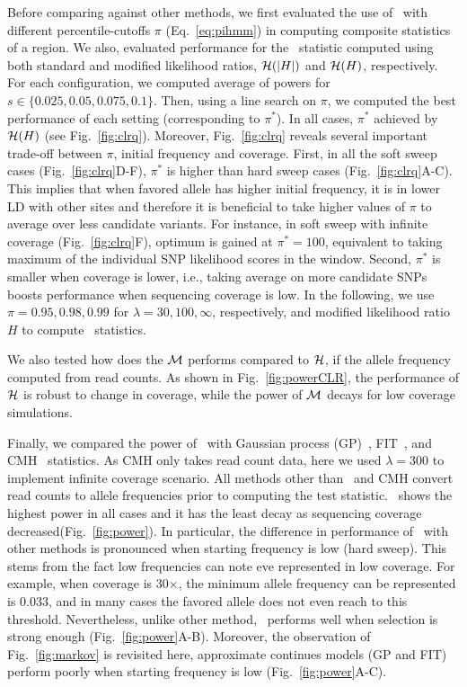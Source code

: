 Before comparing against other methods, we first evaluated the use of \comale\ 
with different percentile-cutoffs $\pi$ (Eq.~\ref{eq:pihmm})
in computing composite statistics of a region. 
We also, evaluated 
performance for the \comale\ statistic computed using both standard and 
modified likelihood ratios, ${\cal H}(|H|)$ and ${\cal H}(H)$, respectively.
For each configuration, we computed average of powers for 
$s\in\{0.025,0.05,0.075,0.1\}$. 
Then, using a line search on $\pi$, we computed the best performance of each 
setting (corresponding to $\pi^*$). In all cases, $\pi^*$ achieved by ${\cal H}(H)$ 
(see Fig.~\ref{fig:clrq}).
Moreover, Fig.~\ref{fig:clrq} reveals several important trade-off between 
$\pi$, initial frequency and coverage.
First, in all the soft sweep cases (Fig.~\ref{fig:clrq}D-F), $\pi^*$ is higher 
than hard sweep cases (Fig.~\ref{fig:clrq}A-C). This implies that when 
favored allele has higher initial frequency, it 
is in lower LD with other sites and therefore it is beneficial to take higher 
values of $\pi$ to average over less candidate variants. For instance, in soft 
sweep with infinite coverage 
(Fig.~\ref{fig:clrq}F), optimum is gained at $\pi^*=100$, equivalent to taking 
maximum of the individual SNP likelihood scores in the window.
Second, $\pi^*$ is smaller when coverage is lower, i.e., taking average on more 
candidate SNPs boosts performance when sequencing coverage is low.
In the following, we use $\pi=0.95,0.98, 0.99$ for $\lambda=30,100,\infty$, 
respectively, and modified likelihood ratio $H$ to 
compute \comale\ statistics.

We also tested how does the ${\cal M}$ performs compared to ${\cal H}$,
if the allele frequency computed from read counts.
As shown in Fig.~\ref{fig:powerCLR}, the performance of
${\cal H}$ is robust to change in coverage, while the power of
${\cal M}$ decays for low coverage simulations.

Finally, we compared the power of \comale\ with Gaussian process
(GP)~\cite{Terhorst2015Multi}, FIT~\cite{feder2014Identifying}, and
CMH~\cite{agresti2011categorical} statistics. 
As CMH only takes read count data, here we used $\lambda=300$ to implement 
infinite coverage scenario. All methods other than \comale\ and CMH convert 
read counts to allele frequencies prior to computing the test statistic. 
\comale\ shows the highest power in all cases and it has the least decay as 
sequencing coverage decreased(Fig.~\ref{fig:power}). In particular, the 
difference in performance of \comale\ with other methods is pronounced when 
starting frequency is low (hard sweep). This stems from the fact low 
frequencies can note eve represented in low coverage. For example, when 
coverage is 30$\times$, the minimum allele frequency can be represented is 
0.033, and 
in many cases the favored allele does not even reach to this threshold. 
Nevertheless, unlike other method, \comale\ performs well when selection is 
strong enough (Fig.~\ref{fig:power}A-B). Moreover, the observation of 
Fig.~\ref{fig:markov} is revisited here, approximate continues models (GP and 
FIT) perform poorly when starting frequency is low (Fig.~\ref{fig:power}A-C).


